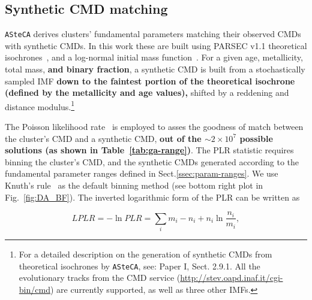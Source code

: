 \documentclass[referee]{aa}
\begin{document}

\subsection{Synthetic CMD matching}
\label{ssec:synth-match}

\texttt{ASteCA} derives clusters' fundamental parameters matching their observed
CMDs with synthetic CMDs. In this work these are built using PARSEC v1.1
theoretical isochrones~\citep[][B12]{Bressan_2012},
and a log-normal initial mass function~\citep[IMF,][]{Chabrier_2001}.
%
For a given age, metallicity, total mass, \textbf{and binary fraction}, a
synthetic CMD is built from a stochastically sampled IMF \textbf{down to the
faintest portion of the theoretical isochrone (defined by the metallicity and
age values),} shifted by a reddening and distance modulus.\footnote{For a
detailed description on the generation of synthetic CMDs from theoretical
isochrones by \texttt{ASteCA}, see: Paper I, Sect. 2.9.1. All the evolutionary
tracks from the CMD service (\url{http://stev.oapd.inaf.it/cgi-bin/cmd}) are
currently supported, as well as three other IMFs.}

The Poisson likelihood rate~\citep[PLR,][]{Dolphin_2002} is employed
to asses the goodness of match between the cluster's CMD and a synthetic
CMD, \textbf{out of the ${\sim}2{\times}10^7$ possible solutions (as shown in
Table~\ref{tab:ga-range})}.
The PLR statistic requires binning the cluster's CMD, and the synthetic CMDs
generated according to the fundamental parameter ranges defined in
Sect.\ref{ssec:param-ranges}.
We use Knuth's rule~\citep[][also implemented via the astroML package]
{Knuth_2006} as the default binning method (see bottom right plot in
Fig.~\ref{fig:DA_BF}).
The inverted logarithmic form of the PLR can be written as

\begin{equation}
LPLR  = -\ln PLR = \sum_i m_i - n_i + n_i \ln \frac{n_i}{m_i},
\label{eq:likelihood}
\end{equation}
\end{document}
